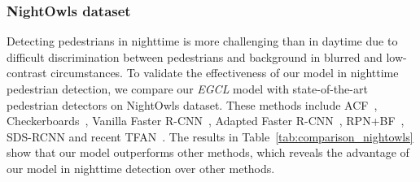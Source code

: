 \documentclass[journal]{IEEEtran}
\newcommand{\MR}[1]{\textcolor[rgb]{0,0,0} {#1}}
\begin{document}
\subsubsection{NightOwls dataset}
Detecting pedestrians in nighttime is more challenging than in daytime due to difficult discrimination between pedestrians and background in blurred and low-contrast circumstances. To validate the effectiveness of our model in nighttime pedestrian detection, we compare our \emph{EGCL} model with state-of-the-art pedestrian detectors on NightOwls dataset. These methods include ACF~\cite{dollar2014fast}, Checkerboards~\cite{zhang2015filtered}, Vanilla Faster R-CNN~\cite{ren2016faster}, Adapted Faster R-CNN~\cite{zhang2017citypersons}, RPN+BF~\cite{zhang2016faster}, SDS-RCNN\cite{brazil2017illuminating} and recent TFAN~\cite{wu2020temporal}.
The results in Table~\ref{tab:comparison_nightowls} show that \MR{our model outperforms other methods}, which reveals the advantage of our model in nighttime  detection over other methods. 




\begin{table}[!t]
\centering
\caption{Performance ( in terms of ) of our \emph{EGCL} and other methods on TJU-DHD-pedestrian dataset including two sub-datasets (lower is better).}
\renewcommand\arraystretch{1.5} 
\label{tab:sota-tju}
\end{table}
\end{document}
